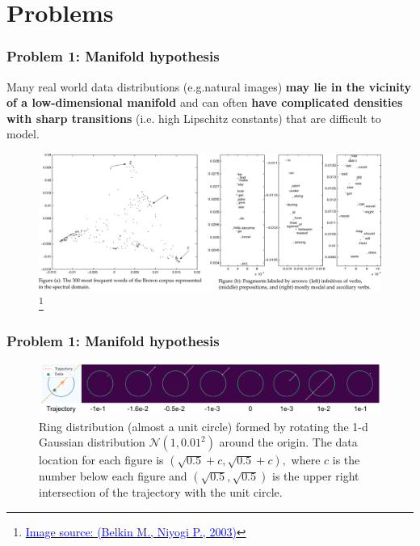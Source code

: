 \documentclass[t]{beamer}  %
\newcommand\blfootnote[1]{%
  \begingroup
  \renewcommand\thefootnote{}\footnote{#1}%
  \addtocounter{footnote}{-1}%
  \endgroup
}
\begin{document}
\section{Problems}
\begin{frame}
\frametitle{Problem 1: Manifold hypothesis}
Many real world data distributions (e.g.natural images) 
\newline
\textbf{may lie in the vicinity of a low-dimensional manifold} and can often \textbf{have complicated densities with sharp transitions} (i.e. high Lipschitz constants) that are difficult to model.
\begin{figure}[h]
\includegraphics[width=\textwidth]{images/laplas.pdf}
\scriptsize\blfootnote{\href{https://www2.imm.dtu.dk/projects/manifold/Papers/Laplacian.pdf}{\scriptsize{\textcolor{blue}{Image source: (Belkin M., Niyogi P., 2003)}}}}
\end{figure}
\end{frame}

\begin{frame}[c]
\frametitle{Problem 1: Manifold hypothesis}
\begin{figure}[hp]

\includegraphics[width=\textwidth]{images/sharp.png}
\caption{ Ring distribution (almost a unit circle) formed by rotating the 1-d Gaussian distribution $\mathcal{N}\left(1,0.01^{2}\right)$ around the origin. The data location for each figure is $(\sqrt{0.5}+c, \sqrt{0.5}+c),$ where $c$ is the number below each figure and $(\sqrt{0.5}, \sqrt{0.5})$ is the upper right intersection of the trajectory with the unit circle. \cite{orig}
}
\end{figure}
\end{frame}
\end{document}
